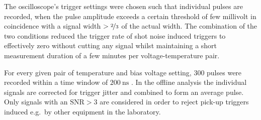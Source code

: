 The oscilloscope's trigger settings were chosen such that individual pulses are recorded, when the pulse amplitude exceeds a certain threshold of few millivolt in coincidence with a
 signal width $> \nicefrac{2}{3}$ of the actual width. %
The combination of the two conditions reduced the trigger rate of shot noise induced triggers to effectively zero without cutting any signal
 whilst maintaining a short measurement duration of a few minutes per voltage-temperature pair. 

For every given pair of temperature and bias voltage setting, 300 pulses were recorded within a time window of $\SI{200}{\nano\second}$ . 
In the offline analysis the individual signals are corrected for trigger jitter and combined to form an average pulse. 
Only signals with an $\textrm{SNR}> 3$ are considered in order to
 reject pick-up triggers induced e.g.~by other equipment in the laboratory. 


